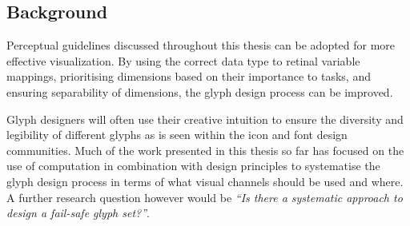 \subsection{Background}
Perceptual guidelines discussed throughout this thesis can be adopted for more effective visualization. 
By using the correct data type to retinal variable mappings, prioritising dimensions based on their importance to tasks, and ensuring separability of dimensions, the glyph design process can be improved.

Glyph designers will often use their creative intuition to ensure the diversity and legibility of different glyphs as is seen within the icon and font design communities.
Much of the work presented in this thesis so far has focused on the use of computation in combination with design principles to systematise the glyph design process in terms of what visual channels should be used and where. 
A further research question however would be \emph{``Is there a systematic approach to design a fail-safe glyph set?''}.

